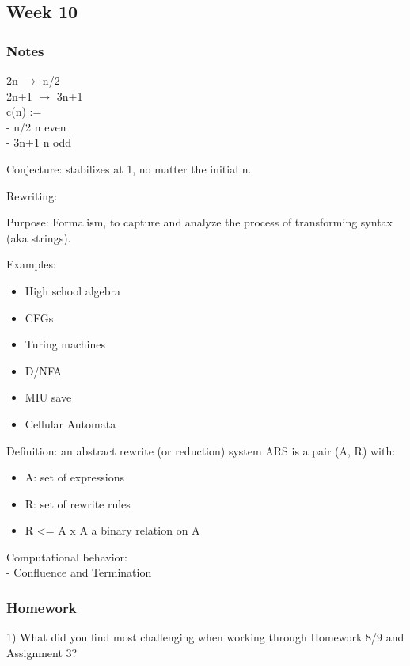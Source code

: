 \documentclass{article}
\theoremstyle{theorem}
\theoremstyle{definition}
\theoremstyle{remark}
\begin{document}
\subsection{Week 10}

\subsubsection*{Notes}

2n $\rightarrow$ n/2 \\
2n+1 $\rightarrow$ 3n+1 \\

c(n) := { \\
  - n/2 n even \\
  - 3n+1 n odd \\
  }

Conjecture: stabilizes at 1, no matter the initial n.

Rewriting:

Purpose:
Formalism, to capture and analyze the process of transforming syntax (aka strings).

Examples: \\
\begin{itemize}
  \item High school algebra
  \item CFGs
  \item Turing machines
  \item D/NFA
  \item MIU save
  \item Cellular Automata
\end{itemize}

Definition: an abstract rewrite (or reduction) system ARS is a pair (A, R) with: \\
\begin{itemize}
  \item A: set of expressions
  \item R: set of rewrite rules
  \item R <= A x A a binary relation on A
\end{itemize}

Computational behavior: \\
- Confluence and Termination
\subsubsection*{Homework}

1) What did you find most challenging when working through Homework 8/9 and Assignment 3?
\end{document}
